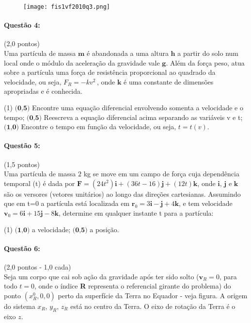 \documentclass[12pt,a4paper]{article}
\begin{document}
\begin{figure}[h]
\centering
\texttt{[image: fis1vf2010q3.png]}
\end{figure}


\paragraph{Questão 4:}(2,0 pontos)\\
Uma partícula de massa $\textbf{m}$ é abandonada a uma altura $\textbf{h}$ a partir do solo num local onde o módulo da aceleração da gravidade vale $\textbf{g}$. Além da força peso, atua sobre a partícula uma força de resistência proporcional ao quadrado da velocidade, ou seja, $F_R=-kv^2\,$, onde $\textbf{k}$ é uma constante de dimensões apropriadas e é conhecida.

\begin{tasks}(1)
\task $\textbf{(0,5)}$ Encontre uma equação diferencial envolvendo somenta a velocidade e o tempo;
\task $\textbf{(0,5)}$ Reescreva a equação diferencial acima separando as variáveis v e t;
\task $\textbf{(1,0)}$ Encontre o tempo em função da velocidade, ou seja, $t=t(v)$.
\end{tasks}

\paragraph{Questão 5:}(1,5 pontos)\\
Uma partícula de massa $2$ kg se move em um campo de força cuja dependência temporal (t) é dada por $\textbf{F}=(24t^2)\textbf{i}+(36t-16)\textbf{j}+(12t)\textbf{k}$, onde $\textbf{i}$, $\textbf{j}$ e $\textbf{k}$ são os versores (vetores unitários) ao longo das direções cartesianas. Assumindo que em t=0 a partícula está localizada em $\textbf{r}_0=3\textbf{i}-\textbf{j}+4\textbf{k}$, e tem velocidade $\textbf{v}_0=6\textbf{i}+15\textbf{j}-8\textbf{k}$, determine em qualquer instante t para a partícula:

\begin{tasks}(1)
\task $\textbf{(1,0)}$ a velocidade;
\task $\textbf{(0,5)}$ a posição.
\end{tasks}

\paragraph{Questão 6:}(2,0 pontos - 1,0 cada)\\
Seja um corpo que cai sob ação da gravidade após ter sido solto ($\textbf{v}_R=0$, para todo $t=0$, onde o índice \textbf{R} representa o referencial girante do problema) do ponto $(x_R^0,0,0)$ perto da superfície da Terra no Equador - veja figura. A origem do sistema $x_R$, $y_R$, $z_R$ está no centro da Terra. O eixo de rotação da Terra é o eixo $z$.
\end{document}
